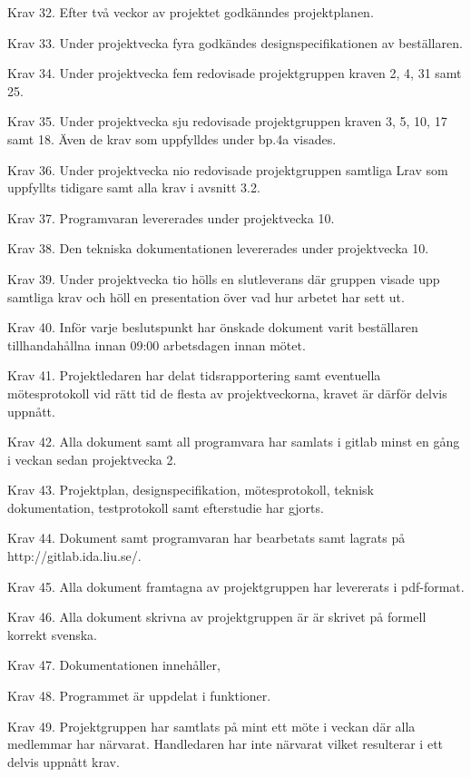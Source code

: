 \documentclass[10pt,oneside,swedish]{lips-no_customer}
\begin{document}
Krav 32. Efter två veckor av projektet godkänndes projektplanen. 

Krav 33. Under projektvecka fyra godkändes designspecifikationen av beställaren. 

Krav 34. Under projektvecka fem redovisade projektgruppen kraven 2, 4, 31 samt 25. 

Krav 35. Under projektvecka sju redovisade projektgruppen kraven 3, 5, 10, 17
samt 18. Även de krav som uppfylldes under bp.4a visades. 

Krav 36. Under projektvecka nio redovisade projektgruppen samtliga Lrav som
uppfyllts tidigare samt alla krav i avsnitt 3.2.

Krav 37. Programvaran levererades under projektvecka 10. 

Krav 38. Den tekniska dokumentationen levererades under projektvecka 10. 

Krav 39. Under projektvecka tio hölls en slutleverans där gruppen visade upp
samtliga krav och höll en presentation över vad hur arbetet har sett ut. 

Krav 40. Inför varje beslutspunkt har önskade dokument varit beställaren
tillhandahållna innan 09:00 arbetsdagen innan mötet. 

Krav 41. Projektledaren har delat tidsrapportering samt eventuella
mötesprotokoll vid rätt tid de flesta av projektveckorna, kravet är därför
delvis uppnått.

Krav 42. Alla dokument samt all programvara har samlats i gitlab minst en gång i
veckan sedan projektvecka 2. 

Krav 43. Projektplan, designspecifikation, mötesprotokoll, teknisk
dokumentation, testprotokoll samt efterstudie har gjorts. 

Krav 44. Dokument samt programvaran har bearbetats samt lagrats på
http://gitlab.ida.liu.se/.  

Krav 45. Alla dokument framtagna av projektgruppen har levererats i pdf-format. 

Krav 46. Alla dokument skrivna av projektgruppen är är skrivet på formell
korrekt svenska.

Krav 47. Dokumentationen innehåller, 

Krav 48. Programmet är uppdelat i funktioner. 

Krav 49. Projektgruppen har samtlats på mint ett möte i veckan där alla
medlemmar har närvarat. Handledaren har inte närvarat vilket resulterar i ett
delvis uppnått krav. 
\end{document}
